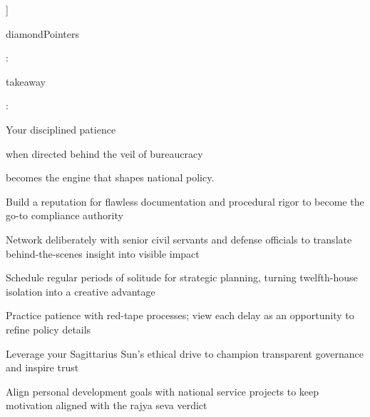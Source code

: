 {\fontsize{9}{13}\selectfont ]}\par\vspace{1.8mm}

{\fontsize{9}{13}\selectfont diamondPointers}\par\vspace{1.8mm}

{\fontsize{9}{13}\selectfont :}\par\vspace{1.8mm}

{\fontsize{9}{13}\selectfont takeaway}\par\vspace{1.8mm}

{\fontsize{9}{13}\selectfont :}\par\vspace{1.8mm}

{\fontsize{9}{13}\selectfont Your disciplined patience}\par\vspace{1.8mm}

{\fontsize{9}{13}\selectfont when directed behind the veil of bureaucracy}\par\vspace{1.8mm}

{\fontsize{9}{13}\selectfont becomes the engine that shapes national policy.}\par\vspace{1.8mm}

\begin{diamondlist}
  \item {\fontsize{8.5}{12}\selectfont Build a reputation for flawless documentation and procedural rigor to become the go-to compliance authority}
  \item {\fontsize{8.5}{12}\selectfont Network deliberately with senior civil servants and defense officials to translate behind-the-scenes insight into visible impact}
  \item {\fontsize{8.5}{12}\selectfont Schedule regular periods of solitude for strategic planning, turning twelfth-house isolation into a creative advantage}
  \item {\fontsize{8.5}{12}\selectfont Practice patience with red-tape processes; view each delay as an opportunity to refine policy details}
  \item {\fontsize{8.5}{12}\selectfont Leverage your Sagittarius Sun's ethical drive to champion transparent governance and inspire trust}
  \item {\fontsize{8.5}{12}\selectfont Align personal development goals with national service projects to keep motivation aligned with the rajya seva verdict}
\end{diamondlist}

